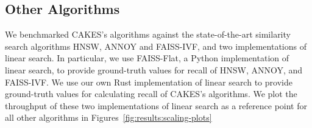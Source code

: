 \subsection{Other Algorithms}
\label{sec:datasets-and-benchmarks:other-algorithms}

We benchmarked CAKES's algorithms against the state-of-the-art similarity search algorithms HNSW, ANNOY and FAISS-IVF, and two implementations of linear search.
In particular, we use FAISS-Flat, a Python implementation of linear search, to provide ground-truth values for recall of HNSW, ANNOY, and FAISS-IVF.
We use our own Rust implementation of linear search to provide ground-truth values for calculating recall of CAKES's algorithms.
We plot the throughput of these two implementations of linear search as a reference point for all other algorithms in Figures~\ref{fig:results:scaling-plots}
